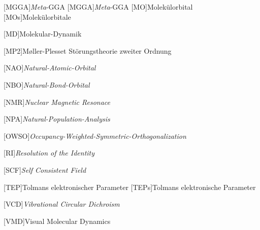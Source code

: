 \begin{acronym}[SEPSEP]
	[MGGA]{\textit{Meta}-GGA}   
		{\textit{Meta}-GGA}	
	[MO]{Molekülorbital}   
		[MOs]{Molekülorbitale}
		
	[MD]{Molekular-Dynamik}
	
	[MP2]{M\o ller-Plesset Störungstheorie zweiter Ordnung}
		
    [NAO]{\textit{Natural-Atomic-Orbital}}

    [NBO]{\textit{Natural-Bond-Orbital}}
    
    [NMR]{\textit{Nuclear Magnetic Resonace}}
        
    [NPA]{\textit{Natural-Population-Analysis}}
    
    [OWSO]{\textit{Occupancy-Weighted-Symmetric-Orthogonalization}}
    
    [RI]{\textit{Resolution of the Identity}}
    
	[SCF]{\textit{Self Consistent Field}}   

	[TEP]{Tolmans elektronischer Parameter}   
		{Tolmans elektronische Parameter}
		
	[VCD]{\textit{Vibrational Circular Dichroism}}

    

        
    [VMD]{Visual Molecular Dynamics}
\end{acronym}
